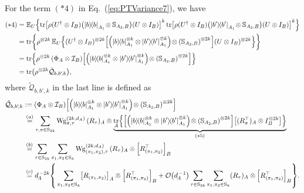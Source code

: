 \documentclass[aps,prl,twocolumn,nofootinbib,superscriptaddress,10pt]{revtex4-2}
\let\originalleft\left
\let\originalright\right
\renewcommand{\left}{\mathopen{}\mathclose\bgroup\originalleft}
\renewcommand{\right}{\aftergroup\egroup\originalright}
\def\E{ {\mathbb E} } %
\newcommand{\ketbra}[2]{\ensuremath{\left|#1\right\rangle\!\left\langle#2\right|}}
\DeclareMathOperator{\Tr}{tr}
\newcommand{\bigo}[1]{\mathcal{O}\left(#1\right)}
\theoremstyle{plain}
\theoremstyle{definition}
\newcommand{\Wg}{\mathrm{Wg}}
\newcommand{\eref}[1]{Eq.~\textup{(\ref{#1})}}
\begin{document}
For the term $(*4)$ in \eref{eq:PTVariance7}, we have 
\begin{align}\label{eq:PTVariance9} 
(*4)&= 
\E_{U} \left\lbrace 
\Tr\left[\rho(U^{\dag}\otimes I_B) \left(\ketbra{b}{b}_{A_1}   \!\otimes \mathbb{S}_{A_2,B} \right) (U\otimes I_B) \right]^{k}
\Tr\left[\rho(U^{\dag}\otimes I_B) \left(\ketbra{b'}{b'}_{A_1} \!\otimes \mathbb{S}_{A_2,B} \right) (U\otimes I_B) \right]^{k} 
\right\rbrace
\nonumber\\
&= 
\Tr \!\bigg\{ \rho^{\otimes 2k} \, \E_{U} \left\{(U^{\dag}\otimes I_B)^{\otimes 2k} 
\left[\left(\ketbra{b}{b}_{A_1}^{\otimes k}\otimes\ketbra{b'}{b'}_{A_1}^{\otimes k} \right) \!\otimes \left( \mathbb{S}_{A_2,B} \right)^{\otimes 2k} \right]
(U\otimes I_B)^{\otimes 2k} \right\} \bigg\}
\nonumber\\
&= 
\Tr\left\{\rho^{\otimes 2k} \, \left(\Phi_{A}\otimes \mathcal{I}_{B} \right) 
\left[\left(\ketbra{b}{b}_{A_1}^{\otimes k}\otimes\ketbra{b'}{b'}_{A_1}^{\otimes k} \right) \!\otimes \left( \mathbb{S}_{A_2,B} \right)^{\otimes 2k} \right] \right\}
\nonumber\\
&= \Tr \left( \rho^{\otimes 2k}\tilde{\mathcal{Q}}_{b,b'\!,k}\right) , 
\end{align}
where $\tilde{\mathcal{Q}}_{b,b'\!,k}$ in the last line is defined as 
\begin{align}\label{eq:PTVariance10} 
\tilde{\mathcal{Q}}_{b,b'\!,k} &:= 
\left(\Phi_{A}\otimes \mathcal{I}_{B} \right) 
\left[\left(\ketbra{b}{b}_{A_1}^{\otimes k}\otimes\ketbra{b'}{b'}_{A_1}^{\otimes k} \right) \!\otimes \left( \mathbb{S}_{A_2,B} \right)^{\otimes 2k} \right]
\nonumber\\
&\,\stackrel{(a)}{=} \sum_{\tau,\pi\in \mathrm{S}_{2k}} \Wg_{\pi,\tau}^{(2k,d_A)} \, 
(R_{\tau})_A \otimes 
\underbrace{\Tr_A \left\lbrace \left[\left(\ketbra{b}{b}_{A_1}^{\otimes k}\otimes\ketbra{b'}{b'}_{A_1}^{\otimes k} \right) \!\otimes \left( \mathbb{S}_{A_2,B} \right)^{\otimes 2k} \right]
\left[  (R_{\pi}^{\top})_A \otimes I_B^{\otimes 2k} \right] \right\rbrace }_{(*5)}
\nonumber \\
&\,\stackrel{(b)}{=} \sum_{\tau \in \mathrm{S}_{2k}} \sum_{\pi_1,\pi_2 \in \mathrm{S}_{k}} \Wg_{(\pi_1,\pi_2),\tau}^{(2k,d_A)} \, 
(R_\tau)_{A} \otimes \left[ R_{(\pi_1,\pi_2)}^\top\right] _B
\nonumber \\
&\,\stackrel{(c)}{=} d_{\!A}^{\,-2k} \left\lbrace \,\sum_{\pi_1,\pi_2\in \mathrm{S}_{k}} 
\left[R_{(\pi_1,\pi_2)}\right]_A \otimes \left[ R_{(\pi_1,\pi_2)}^\top\right]_B
+ \bigo{d_{\!A}^{\,-1}} \sum_{\tau \in \mathrm{S}_{2k}} \sum_{\pi_1,\pi_2 \in \mathrm{S}_{k}}  
(R_\tau)_{A} \otimes \left[ R_{(\pi_1,\pi_2)}^\top\right]_B \right\rbrace  .
\end{align}
\end{document}
